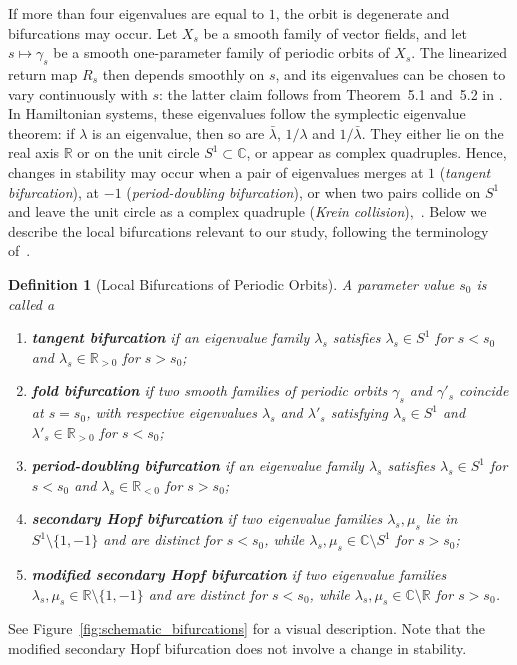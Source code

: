 \documentclass[pdflatex,sn-mathphys-ay]{sn-jnl}%
\theoremstyle{thmstyleone}%
\theoremstyle{thmstyletwo}%
\theoremstyle{thmstylethree}%
\newtheorem{definition}{Definition}%
\newcommand{\C}{{\mathbb{C}}}
\newcommand{\R}{{\mathbb{R}}}
\begin{document}
If more than four eigenvalues are equal to $1$, the orbit is degenerate and bifurcations may occur.
Let $X_s$ be a smooth family of vector fields, and let $s \mapsto \gamma_s$ be a smooth one-parameter family of periodic orbits of $X_s$. The linearized return map $R_s$ then depends smoothly on $s$, and its eigenvalues can be chosen to vary continuously with $s$: the latter claim follows from Theorem~5.1 and~5.2 in \cite[Chapter 2]{kato_eigenvalues}.
In Hamiltonian systems, these eigenvalues follow the symplectic eigenvalue theorem: if $\lambda$ is an eigenvalue, then so are $\bar \lambda$, $1/\lambda$ and $1/\bar \lambda$. 
They either lie on the real axis $\mathbb{R}$ or on the unit circle $S^1 \subset \mathbb{C}$, or appear as complex quadruples.
Hence, changes in stability may occur when a pair of eigenvalues merges at $1$ (\emph{tangent bifurcation}), at $-1$ (\emph{period-doubling bifurcation}), or when two pairs collide on $S^1$ and leave the unit circle as a complex quadruple (\emph{Krein collision}),~\cite{howard_mackay_linear_stability_1987}.  
Below we describe the local bifurcations relevant to our study, following the terminology of~\cite{campbell_bifurcations_1999}.


\begin{definition}[Local Bifurcations of Periodic Orbits]
\label{def:bifurcations}
A parameter value $s_0$ is called a
\begin{enumerate}
    \item \textbf{tangent bifurcation} if an eigenvalue family $\lambda_s$ satisfies $\lambda_s \in S^1$ for $s<s_0$ and $\lambda_s \in \R_{>0}$ for $s>s_0$;
    \item \textbf{fold bifurcation} if two smooth families of periodic orbits $\gamma_s$ and $\gamma'_s$ coincide at $s=s_0$, with respective eigenvalues $\lambda_s$ and $\lambda'_s$ satisfying $\lambda_s \in S^1$ and $\lambda'_s \in \R_{>0}$ for $s<s_0$;
    \item \textbf{period-doubling bifurcation} if an eigenvalue family $\lambda_s$ satisfies $\lambda_s \in S^1$ for $s<s_0$ and $\lambda_s \in \R_{<0}$ for $s>s_0$;
    \item \textbf{secondary Hopf bifurcation} if two eigenvalue families $\lambda_s,\mu_s$ lie in $S^1 \setminus \{1,-1\}$ and are distinct for $s<s_0$, while $\lambda_s,\mu_s \in \C \setminus S^1$ for $s>s_0$;
    \item \textbf{modified secondary Hopf bifurcation} if two eigenvalue families $\lambda_s,\mu_s \in \R \setminus \{1,-1\}$ and are distinct for $s<s_0$, while $\lambda_s,\mu_s \in \C \setminus \R$ for $s>s_0$.
\end{enumerate}
\end{definition}
See Figure~\ref{fig:schematic_bifurcations} for a visual description.
Note that the modified secondary Hopf bifurcation does not involve a change in stability.
\end{document}
